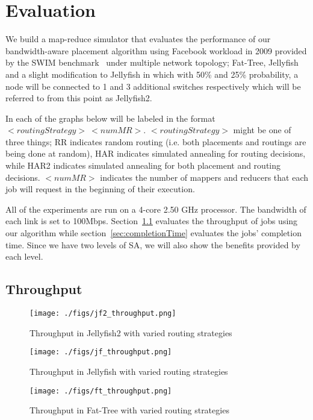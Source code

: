 \section{Evaluation}

We build a map-reduce simulator that evaluates the performance of our
bandwidth-aware placement algorithm using Facebook workload in 2009 provided by
the SWIM benchmark~\cite{SWIM13} under multiple network topology; Fat-Tree,
Jellyfish and a slight modification to Jellyfish in which with 50\% and 25\%
probability, a node will be connected to 1 and 3 additional switches
respectively which will be referred to from this point as Jellyfish2.

In each of the graphs below will be labeled in the format $<routingStrategy>\
<numMR>$.  $<routingStrategy>$ might be one of three things;  RR indicates
random routing (i.e. both placements and routings are being done at random),
HAR indicates simulated annealing for routing decisions, while HAR2 indicates
simulated annealing for both placement and routing decisions.  $<numMR>$
indicates the number of mappers and reducers that each job will request in the
beginning of their execution.

All of the experiments are run on a 4-core 2.50 GHz processor. The bandwidth of
each link is set to 100Mbps. Section~\ref{sec:throughput} evaluates the
throughput of jobs using our algorithm while section~\ref{sec:completionTime}
evaluates the jobs' completion time. Since we have two levels of SA, we will
also show the benefits provided by each level.

\subsection{Throughput}
\label{sec:throughput}

\begin{figure}
  \texttt{[image: ./figs/jf2\_throughput.png]}
  \caption{Throughput in Jellyfish2 with varied routing strategies}
  \label{fig:jf2_throughput}
\end{figure}

\begin{figure}
  \texttt{[image: ./figs/jf\_throughput.png]}
  \caption{Throughput in Jellyfish with varied routing strategies}
  \label{fig:jf_throughput}
\end{figure}

\begin{figure}
  \texttt{[image: ./figs/ft\_throughput.png]}
  \caption{Throughput in Fat-Tree with varied routing strategies}
  \label{fig:ft_throughput}
\end{figure}

